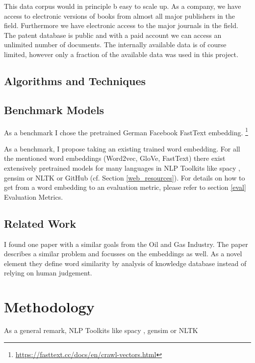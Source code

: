 \documentclass[10pt,a4paper]{article}
\begin{document}
	This data corpus would in principle b easy to scale up. As a company, we have access to electronic versions of books from almost all major publishers in the field. Furthermore we have electronic access to the major journals in the field. The patent database is public and with a paid account we can access an unlimited number of documents.
	The internally available data is of course limited, however only a fraction of the available data was used in this project.      
	 
    \subsection{Algorithms and Techniques}
    \subsection{Benchmark Models}
    As a benchmark I chose the pretrained German Facebook FastText embedding.  \footnote{\url{https://fasttext.cc/docs/en/crawl-vectors.html}}
    
    As a benchmark, I propose taking an existing trained word embedding. For all the mentioned word embeddings (Word2vec, GloVe, FastText) there exist extensively pretrained models for many languages in NLP Toolkits like spacy \cite{spacy2}, gensim \cite{rehurek_lrec} or NLTK \cite{Loper:2002:NNL:1118108.1118117} or GitHub (cf. Section \ref{web_resources}). For details on how to get from a word embedding to an evaluation metric, please refer to section \ref{eval} Evaluation Metrics.
    
	\subsection{Related Work}

    I found one paper with a similar goals \cite{OilandGas} from the Oil and Gas Industry. The paper describes a similar problem and focusses on the embeddings as well. As a novel element they define word similarity by analysis of knowledge database instead of relying on human judgement.
			
	\section{Methodology}
	As a general remark,  NLP Toolkits like spacy \cite{spacy2}, gensim \cite{rehurek_lrec} or NLTK \cite{Loper:2002:NNL:1118108.1118117}
	
	
\end{document}
